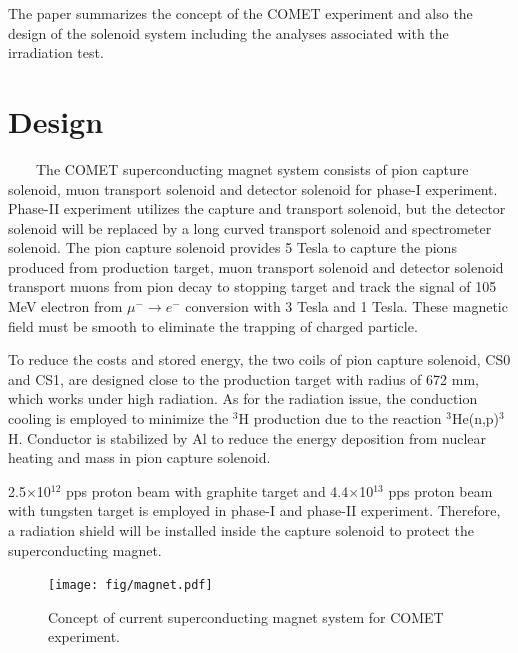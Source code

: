 \documentclass[a4paper, 10pt, twocolumn]{article}
\begin{document}
The paper summarizes the concept of the COMET experiment and also the design of the solenoid system including the analyses associated with the irradiation test.

\section{Design}
~~~~The COMET superconducting magnet system consists of pion capture solenoid, muon transport solenoid and detector solenoid for phase-I experiment.
Phase-II experiment utilizes the capture and transport solenoid, but the detector solenoid will be replaced by a long curved transport solenoid and spectrometer solenoid.
The pion capture solenoid provides 5 Tesla to capture the pions produced from production target, muon transport solenoid and detector solenoid transport muons from pion decay to stopping target and track the signal of 105 MeV electron from $\mu^- \rightarrow e^-$ conversion with 3 Tesla and 1 Tesla.
These magnetic field must be smooth to eliminate the trapping of charged particle.

To reduce the costs and stored energy, the two coils of pion capture solenoid, CS0 and CS1, are designed close to the production target with radius of 672 mm, which works under high radiation.
As for the radiation issue, the conduction cooling is employed to minimize the $^3$H production due to the reaction $^3$He(n,p)$^3$H.
Conductor is stabilized by Al to reduce the energy deposition from nuclear heating and mass in pion capture solenoid.

2.5$\times$10$^{12}$ pps proton beam with graphite target and 4.4$\times$10$^{13}$ pps proton beam with tungsten target is employed in phase-I and phase-II experiment.
Therefore, a radiation shield will be installed inside the capture solenoid to protect the superconducting magnet.
\begin{figure}[H]
 \centering
 \texttt{[image: fig/magnet.pdf]}
 \caption{Concept of current superconducting magnet system for COMET experiment.}
 \label{magnet}
\end{figure}
\end{document}
